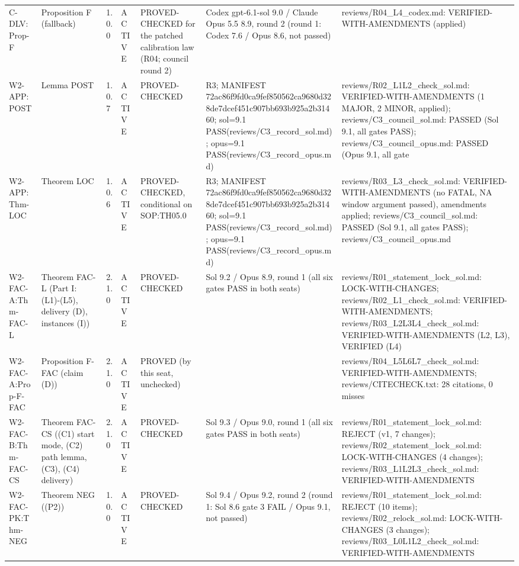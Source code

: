 \begin{longtable}{p{2.2cm}p{2.2cm}p{0.7cm}p{1.2cm}p{3.2cm}p{1.8cm}p{3cm}}
C-DLV:Prop-F & Proposition F (fallback) & 1.0.0 & ACTIVE & PROVED-CHECKED for the patched calibration law (R04; council round 2) & Codex gpt-6.1-sol 9.0 / Claude Opus 5.5 8.9, round 2 (round 1: Codex 7.6 / Opus 8.6, not passed) & reviews/R04\_L4\_codex.md: VERIFIED-WITH-AMENDMENTS (applied) \\
W2-APP:POST & Lemma POST & 1.0.7 & ACTIVE & PROVED-CHECKED & R3; MANIFEST 72ac86f9fd0ca9fef850562ca9680d328de7dcef451c907bb693b925a2b31460; sol=9.1 PASS(reviews/C3\_record\_sol.md); opus=9.1 PASS(reviews/C3\_record\_opus.md) & reviews/R02\_L1L2\_check\_sol.md: VERIFIED-WITH-AMENDMENTS (1 MAJOR, 2 MINOR, applied); reviews/C3\_council\_sol.md: PASSED (Sol 9.1, all gates PASS); reviews/C3\_council\_opus.md: PASSED (Opus 9.1, all gate \\
W2-APP:Thm-LOC & Theorem LOC & 1.0.6 & ACTIVE & PROVED-CHECKED, conditional on SOP:TH05.0 & R3; MANIFEST 72ac86f9fd0ca9fef850562ca9680d328de7dcef451c907bb693b925a2b31460; sol=9.1 PASS(reviews/C3\_record\_sol.md); opus=9.1 PASS(reviews/C3\_record\_opus.md) & reviews/R03\_L3\_check\_sol.md: VERIFIED-WITH-AMENDMENTS (no FATAL, NA window argument passed), amendments applied; reviews/C3\_council\_sol.md: PASSED (Sol 9.1, all gates PASS); reviews/C3\_council\_opus.md \\
W2-FAC-A:Thm-FAC-L & Theorem FAC-L (Part I: (L1)-(L5), delivery (D), instances (I)) & 2.1.0 & ACTIVE & PROVED-CHECKED & Sol 9.2 / Opus 8.9, round 1 (all six gates PASS in both seats) & reviews/R01\_statement\_lock\_sol.md: LOCK-WITH-CHANGES; reviews/R02\_L1\_check\_sol.md: VERIFIED-WITH-AMENDMENTS; reviews/R03\_L2L3L4\_check\_sol.md: VERIFIED-WITH-AMENDMENTS (L2, L3), VERIFIED (L4) \\
W2-FAC-A:Prop-F-FAC & Proposition F-FAC (claim (D)) & 2.1.0 & ACTIVE & PROVED (by this seat, unchecked) &  & reviews/R04\_L5L6L7\_check\_sol.md: VERIFIED-WITH-AMENDMENTS; reviews/CITECHECK.txt: 28 citations, 0 misses \\
W2-FAC-B:Thm-FAC-CS & Theorem FAC-CS ((C1) start mode, (C2) path lemma, (C3), (C4) delivery) & 2.1.0 & ACTIVE & PROVED-CHECKED & Sol 9.3 / Opus 9.0, round 1 (all six gates PASS in both seats) & reviews/R01\_statement\_lock\_sol.md: REJECT (v1, 7 changes); reviews/R02\_statement\_lock\_sol.md: LOCK-WITH-CHANGES (4 changes); reviews/R03\_L1L2L3\_check\_sol.md: VERIFIED-WITH-AMENDMENTS \\
W2-FAC-PK:Thm-NEG & Theorem NEG ((P2)) & 1.0.0 & ACTIVE & PROVED-CHECKED & Sol 9.4 / Opus 9.2, round 2 (round 1: Sol 8.6 gate 3 FAIL / Opus 9.1, not passed) & reviews/R01\_statement\_lock\_sol.md: REJECT (10 items); reviews/R02\_relock\_sol.md: LOCK-WITH-CHANGES (3 changes); reviews/R03\_L0L1L2\_check\_sol.md: VERIFIED-WITH-AMENDMENTS \\

\end{longtable}
